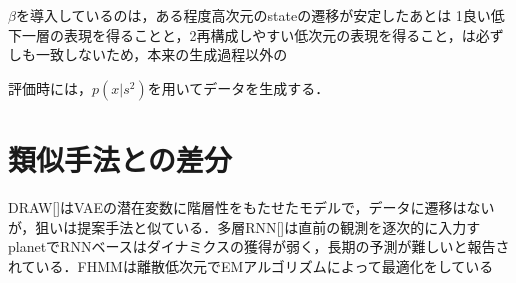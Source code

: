 $\beta$を導入しているのは，ある程度高次元のstateの遷移が安定したあとは
1良い低下一層の表現を得ることと，2再構成しやすい低次元の表現を得ること，は必ずしも一致しないため，本来の生成過程以外の



評価時には，$p(x|s^2)$を用いてデータを生成する．

\section{類似手法との差分}
DRAW[]はVAEの潜在変数に階層性をもたせたモデルで，データに遷移はないが，狙いは提案手法と似ている．多層RNN[]は直前の観測を逐次的に入力すplanetでRNNベースはダイナミクスの獲得が弱く，長期の予測が難しいと報告されている．FHMMは離散低次元でEMアルゴリズムによって最適化をしている


